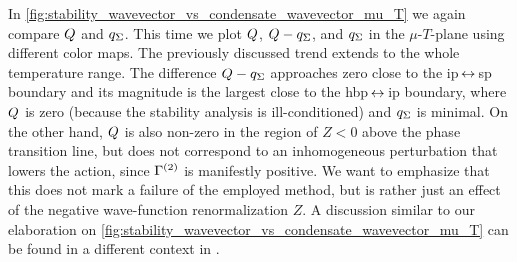 In \cref{fig:stability_wavevector_vs_condensate_wavevector_mu_T} we again compare $Q$ and $q_{\Sigma}$.
This time we plot $Q$, $Q - q_{\Sigma}$, and $q_{\Sigma}$ in the $\mu$-$T$-plane using different color maps.
The previously discussed trend extends to the whole temperature range.
The difference $Q - q_{\Sigma}$ approaches zero close to the \gls{ip}$\,\leftrightarrow\,$\gls{sp} boundary and its magnitude is the largest close to the \gls{hbp}$\,\leftrightarrow\,$\gls{ip} boundary, where $Q$ is zero (because the stability analysis is ill-conditioned) and $q_{\Sigma}$ is minimal.
On the other hand, $Q$ is also non-zero in the region of $Z < 0$ above the phase transition line, but does not correspond to an inhomogeneous perturbation that lowers the action, since $\Gamma^{(2)}$ is manifestly positive.
We want to emphasize that this does not mark a failure of the employed method, but is rather just an effect of the negative wave-function renormalization $Z$.
A discussion similar to our elaboration on \cref{fig:stability_wavevector_vs_condensate_wavevector_mu_T} can be found in a different context in .\clearpage

